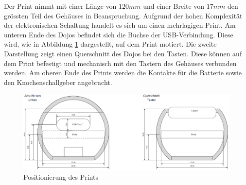 Der Print nimmt mit einer Länge von $120mm$ und einer Breite von $17mm$ den grössten Teil des Gehäuses in Beanspruchung. Aufgrund der hohen Komplexität der elektronischen Schaltung handelt es sich um einen mehrlagigen Print. Am unteren Ende des Dojos befindet sich die Buchse der USB-Verbindung. Diese wird, wie in Abbildung \ref{fig:DojoPrintQuerschnitt} dargestellt, auf dem Print motiert. Die zweite Darstellung zeigt einen Querschnitt des Dojos bei den Tasten. Diese können auf dem Print befestigt und mechanisch mit den Tastern des Gehäuses verbunden werden. Am oberen Ende des Prints werden die Kontakte für die Batterie sowie den Knochenschallgeber angebracht.


\begin{figure}[h]
	\centering
	\includegraphics[width=\textwidth]{graphics/DojoPrintQuerschnitt.png}
	\caption{Positionierung des Prints}
	\label{fig:DojoPrintQuerschnitt}
\end{figure}


